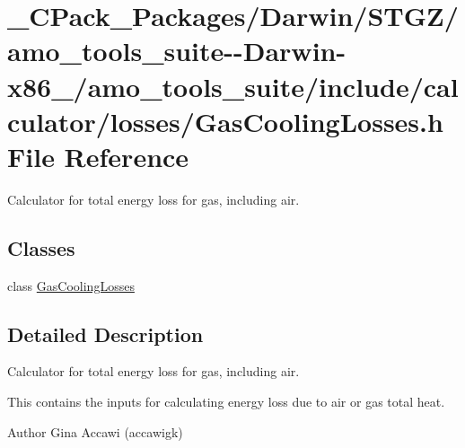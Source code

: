 \hypertarget{___c_pack___packages_2_darwin_2_s_t_g_z_2amo__tools__suite--_darwin-x86__64_2amo__tools__suite_2a205f1c3faea20d1b572055736aa9a09}{}\section{\+\_\+\+C\+Pack\+\_\+\+Packages/\+Darwin/\+S\+T\+G\+Z/amo\+\_\+tools\+\_\+suite-\/-\/\+Darwin-\/x86\+\_/amo\+\_\+tools\+\_\+suite/include/calculator/losses/\+Gas\+Cooling\+Losses.h File Reference}
\label{___c_pack___packages_2_darwin_2_s_t_g_z_2amo__tools__suite--_darwin-x86__64_2amo__tools__suite_2a205f1c3faea20d1b572055736aa9a09}


Calculator for total energy loss for gas, including air.  


\subsection*{Classes}
\begin{DoxyCompactItemize}
\item 
class \hyperlink{class_gas_cooling_losses}{Gas\+Cooling\+Losses}
\end{DoxyCompactItemize}


\subsection{Detailed Description}
Calculator for total energy loss for gas, including air. 

This contains the inputs for calculating energy loss due to air or gas total heat.

\begin{DoxyAuthor}{Author}
Gina Accawi (accawigk) 
\end{DoxyAuthor}

